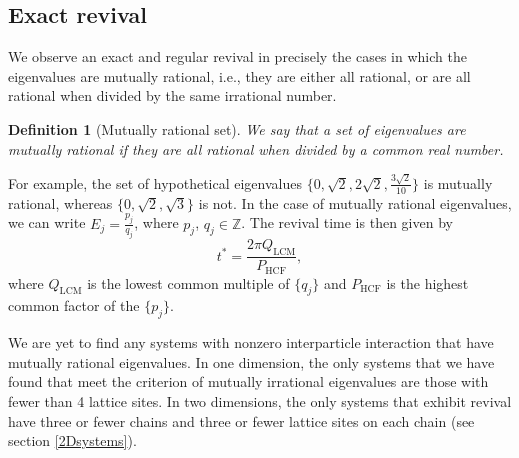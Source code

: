 \documentclass[a4paper, 10pt]{article}
\theoremstyle{plain}
\newtheorem{definition}[]{Definition}
\begin{document}
\subsection{Exact revival}

We observe an exact and regular revival in precisely the cases in which the
eigenvalues are mutually rational, i.e., they are either all rational, or are
all rational when divided by the same irrational number.
\begin{definition}[Mutually rational set]
    We say that a set of eigenvalues are mutually rational if they are all
    rational when divided by a common real number.
\end{definition}
For example, the set of hypothetical eigenvalues $\lbrace 0, \sqrt{2}, 2
\sqrt{2}, \frac{3 \sqrt{2}}{10} \rbrace$ is mutually rational, whereas $\lbrace
0, \sqrt{2}, \sqrt{3}\rbrace$ is not. In the case of mutually rational
eigenvalues, we can write $E_{j} = \frac{p_{j}}{q_{j}}$, where $p_{j}$, $q_{j}
\in \mathbb{Z}$. The revival time is then given by
\begin{equation}
    \label{revival_time_formula}
    t^{\ast} = \frac{2 \pi Q_{\text{LCM}}}{P_{\text{HCF}}},
\end{equation}
where $Q_{\text{LCM}}$ is the lowest common multiple of $\lbrace q_{j} \rbrace$
and $P_{\text{HCF}}$ is the highest common factor of the $\lbrace p_{j} \rbrace$.

We are yet to find any systems with nonzero interparticle interaction that have
mutually rational eigenvalues. In one dimension, the only systems that we have
found that meet the criterion of mutually irrational eigenvalues are those with
fewer than 4 lattice sites. In two dimensions, the only systems that exhibit
revival have three or fewer chains and three or fewer lattice sites on each
chain (see section \ref{2Dsystems}).
\end{document}
